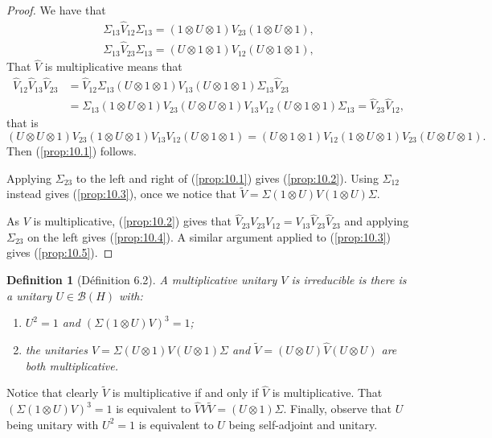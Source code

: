 \documentclass[a4paper,12pt]{article}
\theoremstyle{plain}
\newtheorem{definition}[proposition]{Definition}
\theoremstyle{definition}
\newcommand{\mc}{\mathcal}
\begin{document}
\begin{proof}
We have that
\begin{gather*}
\Sigma_{13} \hat V_{12} \Sigma_{13}
   = (1\otimes U\otimes 1) V_{23} (1\otimes U\otimes 1), \\
\Sigma_{13} \hat V_{23} \Sigma_{13}
   = (U\otimes 1\otimes 1)V_{12}(U\otimes 1\otimes 1),
\end{gather*}
That $\hat V$ is multiplicative means that
\begin{align*} \hat V_{12} \hat V_{13} \hat V_{23}
&= \hat V_{12} \Sigma_{13} (U\otimes 1\otimes 1) V_{13}
(U\otimes 1\otimes 1) \Sigma_{13} \hat V_{23} \\
&= \Sigma_{13}(1\otimes U\otimes 1) V_{23} (U\otimes U\otimes 1) V_{13}
V_{12}(U\otimes 1\otimes 1)\Sigma_{13}
= \hat V_{23} \hat V_{12},
\end{align*}
that is
\[ (U\otimes U\otimes 1) V_{23} (1\otimes U\otimes 1) V_{13}
V_{12}(U\otimes 1\otimes 1)
= (U\otimes 1\otimes 1)V_{12}(1\otimes U\otimes 1)
V_{23} (U\otimes U\otimes 1). \]
Then (\ref{prop:10.1}) follows.

Applying $\Sigma_{23}$ to the left and right of (\ref{prop:10.1}) gives
(\ref{prop:10.2}).  Using $\Sigma_{12}$ instead gives (\ref{prop:10.3}),
once we notice that $\tilde V = \Sigma(1\otimes U)V(1\otimes U)\Sigma$.

As $V$ is multiplicative, (\ref{prop:10.2}) gives that
$\hat V_{23} V_{23} V_{12} = V_{13}\hat V_{23}\hat V_{23}$ and applying
$\Sigma_{23}$ on the left gives (\ref{prop:10.4}).
A similar argument applied to (\ref{prop:10.3}) gives (\ref{prop:10.5}).
\end{proof}

\begin{definition}[D\'efinition 6.2]
A multiplicative unitary $V$ is \emph{irreducible} is there is a unitary
$U\in\mc B(H)$ with:
\begin{enumerate}
\item $U^2=1$ and $(\Sigma(1\otimes U)V)^3 = 1$;
\item the unitaries $\hat V=\Sigma(U\otimes 1)V(U\otimes 1)\Sigma$
and $\tilde V=(U\otimes U)\hat V(U\otimes U)$ are both multiplicative.
\end{enumerate}
\end{definition}

Notice that clearly $\tilde V$ is multiplicative if and only if $\hat V$ is
multiplicative.  That $(\Sigma(1\otimes U)V)^3 = 1$ is equivalent to
$\hat V V \tilde V = (U\otimes 1)\Sigma$.  Finally, observe that $U$ being
unitary with $U^2=1$ is equivalent to $U$ being self-adjoint and unitary.
\end{document}
